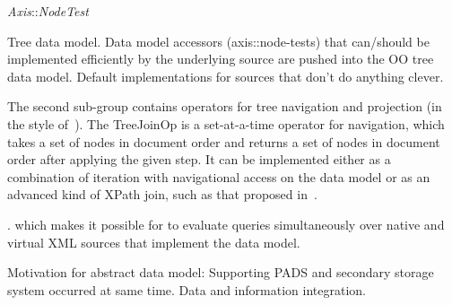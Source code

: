 \textit{Axis}::\textit{NodeTest} 

Tree data model.  Data model accessors (axis::node-tests) that can/should be implemented
efficiently by the underlying source are pushed into the OO tree data
model.  Default implementations for sources that don't do anything
clever.   


The second sub-group contains operators for tree navigation and
projection (in the style of~\cite{projection}). The TreeJoinOp is a
set-at-a-time operator for navigation, which takes a set of nodes in
document order and returns a set of nodes in document order after
applying the given step. It can be implemented either as a combination
of iteration with navigational access on the data model or as an
advanced kind of XPath join, such as that proposed
in~\cite{grust03staircase}.

.  which makes it possible for
\Galax{} to evaluate queries simultaneously over native and virtual
XML sources that implement the data model.   

Motivation for abstract data model: Supporting PADS and secondary
storage system occurred at same time.  Data and information
integration.  


